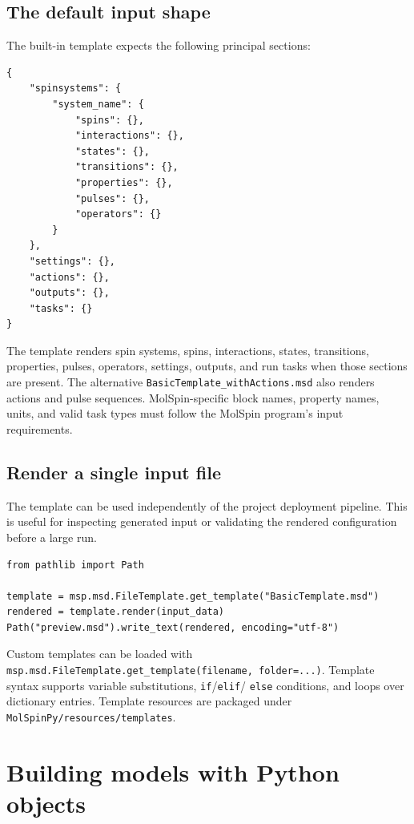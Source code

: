 \documentclass[11pt,a4paper]{article}
\begin{document}
\subsection{The default input shape}

The built-in template expects the following principal sections:

\begin{lstlisting}
{
    "spinsystems": {
        "system_name": {
            "spins": {},
            "interactions": {},
            "states": {},
            "transitions": {},
            "properties": {},
            "pulses": {},
            "operators": {}
        }
    },
    "settings": {},
    "actions": {},
    "outputs": {},
    "tasks": {}
}
\end{lstlisting}

The template renders spin systems, spins, interactions, states, transitions,
properties, pulses, operators, settings, outputs, and run tasks when those
sections are present. The alternative \texttt{BasicTemplate\_withActions.msd}
also renders actions and pulse sequences. MolSpin-specific block names,
property names, units, and valid task types must follow the MolSpin program's
input requirements.

\subsection{Render a single input file}

The template can be used independently of the project deployment pipeline.
This is useful for inspecting generated input or validating the rendered
configuration before a large run.

\begin{lstlisting}
from pathlib import Path

template = msp.msd.FileTemplate.get_template("BasicTemplate.msd")
rendered = template.render(input_data)
Path("preview.msd").write_text(rendered, encoding="utf-8")
\end{lstlisting}

Custom templates can be loaded with
\texttt{msp.msd.FileTemplate.get\_template(filename, folder=...)}. Template
syntax supports variable substitutions, \texttt{if}/\texttt{elif}/
\texttt{else} conditions, and loops over dictionary entries. Template
resources are packaged under \texttt{MolSpinPy/resources/templates}.

\section{Building models with Python objects}
\end{document}
